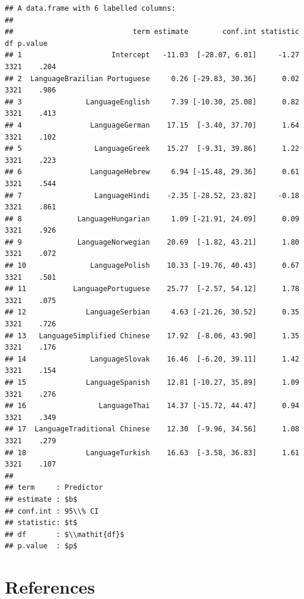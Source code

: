 \documentclass[
  man,floatsintext]{apa6}
\begin{document}
\begin{verbatim}
## A data.frame with 6 labelled columns:
## 
##                            term estimate        conf.int statistic   df p.value
## 1                     Intercept   -11.03  [-28.07, 6.01]     -1.27 3321    .204
## 2  LanguageBrazilian Portuguese     0.26 [-29.83, 30.36]      0.02 3321    .986
## 3               LanguageEnglish     7.39 [-10.30, 25.08]      0.82 3321    .413
## 4                LanguageGerman    17.15  [-3.40, 37.70]      1.64 3321    .102
## 5                 LanguageGreek    15.27  [-9.31, 39.86]      1.22 3321    .223
## 6                LanguageHebrew     6.94 [-15.48, 29.36]      0.61 3321    .544
## 7                 LanguageHindi    -2.35 [-28.52, 23.82]     -0.18 3321    .861
## 8             LanguageHungarian     1.09 [-21.91, 24.09]      0.09 3321    .926
## 9             LanguageNorwegian    20.69  [-1.82, 43.21]      1.80 3321    .072
## 10               LanguagePolish    10.33 [-19.76, 40.43]      0.67 3321    .501
## 11           LanguagePortuguese    25.77  [-2.57, 54.12]      1.78 3321    .075
## 12              LanguageSerbian     4.63 [-21.26, 30.52]      0.35 3321    .726
## 13   LanguageSimplified Chinese    17.92  [-8.06, 43.90]      1.35 3321    .176
## 14               LanguageSlovak    16.46  [-6.20, 39.11]      1.42 3321    .154
## 15              LanguageSpanish    12.81 [-10.27, 35.89]      1.09 3321    .276
## 16                 LanguageThai    14.37 [-15.72, 44.47]      0.94 3321    .349
## 17  LanguageTraditional Chinese    12.30  [-9.96, 34.56]      1.08 3321    .279
## 18              LanguageTurkish    16.63  [-3.58, 36.83]      1.61 3321    .107
## 
## term     : Predictor 
## estimate : $b$ 
## conf.int : 95\\% CI 
## statistic: $t$ 
## df       : $\\mathit{df}$ 
## p.value  : $p$
\end{verbatim}

\newpage

\hypertarget{references}{%
\section{References}\label{references}}

\begingroup
\setlength{\parindent}{-0.5in}
\setlength{\leftskip}{0.5in}
\end{document}
